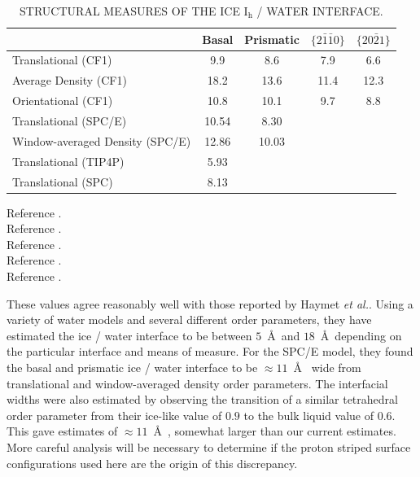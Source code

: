 \begin{table}[h]
\centering
\caption{STRUCTURAL MEASURES OF THE ICE I$_\mathrm{h}$ / WATER
  INTERFACE. \label{tab:structCompare}} 
\begin{tabular}{|l|cccc|}  
\hline
& Basal & Prismatic & $\{2\bar{1}\bar{1}0\}$ & $\{20\bar{2}1\}$ \\
\hline
Translational (CF1)\footnotemark[1] & 9.9 & 8.6  & 7.9 & 6.6 \\
Average Density (CF1)\footnotemark[1] & 18.2 & 13.6 & 11.4 & 12.3 \\
Orientational (CF1)\footnotemark[2] & 10.8 & 10.1 & 9.7 & 8.8 \\
Translational (SPC/E)\footnotemark[5] & 10.54 & 8.30 & & \\
Window-averaged Density (SPC/E) \footnotemark[5] & 12.86 & 10.03 & & \\
Translational (TIP4P)\footnotemark[3] & 5.93 & & & \\
Translational (SPC)\footnotemark[4] & 8.13 & & & \\
\hline
\end{tabular}
\flushleft
  \footnotemark[1]\footnotesize{Reference \cite{Hayward2001}.} \\
  \footnotemark[2]\footnotesize{Reference \cite{Hayward2002}.} \\
  \footnotemark[3]\footnotesize{Reference \cite{Karim1988}.} \\
  \footnotemark[4]\footnotesize{Reference \cite{Karim1990}.} \\
  \footnotemark[5]\footnotesize{Reference \cite{Bryk2002}.} \\
\end{table}








These values agree reasonably well with those reported by Haymet
\textit{et
  al.}.\cite{Karim1988,Karim1990,Hayward2001,Bryk2002,Hayward2002,Bryk2004}
Using a variety of water models and several different order
parameters, they have estimated the ice / water interface to be
between $5$~\AA~and $18$~\AA~depending on the particular interface and
means of measure.  For the SPC/E model, they found the basal and
prismatic ice / water interface to be $\approx 11$~\AA~ wide from
translational and window-averaged density order parameters. The
interfacial widths were also estimated by observing the transition of
a similar tetrahedral order parameter from their ice-like value of
$0.9$ to the bulk liquid value of $0.6$. This gave estimates of
$\approx 11$~\AA~, somewhat larger than our current estimates. More
careful analysis will be necessary to determine if the proton striped
surface configurations used here are the origin of this discrepancy.


